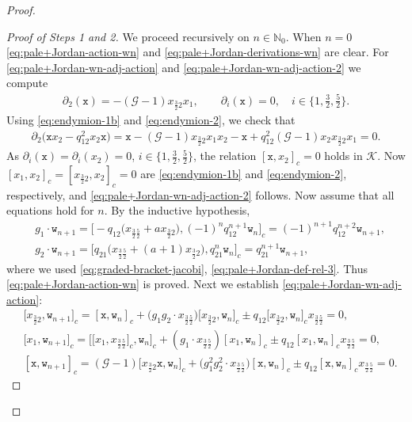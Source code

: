 \documentclass[10pt,a4paper]{amsart}
\numberwithin{equation}{section}
\newcommand{\ghost}{\mathscr{G}}
\newcommand{\K}{{\mathcal{K}}}
\newcommand{\N}{{\mathbb N}}
\newcommand{\wt}{\mathtt{w}}
\newcommand{\xt}{\mathtt{x}}
\newcommand{\tresdos}{\frac{3}{2}}
\newcommand{\cincodos}{\frac{5}{2}}
\begin{document}
\begin{proof}
\begin{proof}[Proof of Steps 1 and 2]
We proceed recursively on $n\in\N_0$.
When $n=0$ \eqref{eq:pale+Jordan-action-wn} and \eqref{eq:pale+Jordan-derivations-wn} are clear. For \eqref{eq:pale+Jordan-wn-adj-action} and \eqref{eq:pale+Jordan-wn-adj-action-2} we compute
\begin{align*}%
\partial_2(\xt) = -(\ghost-1)x_{\tresdos2}x_1, \qquad
\partial_i(\xt) = 0, \quad i\in\big\{1,\tfrac{3}{2},\tfrac{5}{2}\big\}.
\end{align*}
Using \eqref{eq:endymion-1b} and \eqref{eq:endymion-2}, we check that
\begin{align*}
\partial_2 \big(\xt x_2-q_{12}^2 x_2\xt\big) = \xt -(\ghost-1)x_{\tresdos2}x_1 x_2 -\xt +q_{12}^2(\ghost-1) x_2x_{\tresdos2}x_1=0.
\end{align*}
As $\partial_i(\xt) = \partial_i(x_2) = 0$, $i\in\{1,\tresdos,\cincodos\}$, the relation
$[\xt, x_2]_c=0$ holds in $\K$. Now $[x_1,x_2]_c=[x_{\tresdos2},x_2]_c=0$ are \eqref{eq:endymion-1b} and \eqref{eq:endymion-2}, respectively, and \eqref{eq:pale+Jordan-wn-adj-action-2} follows.
Now assume that all equations hold for $n$. By the inductive hypothesis,
\begin{align*}
&g_1\cdot \wt_{n+1} = \bigl[-q_{12}\big(x_{\tresdos\cincodos}+ax_{\tresdos2}\big), (-1)^n q_{12}^{n+1} \wt_n\big]_c =(-1)^{n+1} q_{12}^{n+2} \wt_{n+1},
\\
&g_2\cdot \wt_{n+1} = \big[q_{21}\big(x_{\tresdos\cincodos}+(a+1)x_{\tresdos2}\big), q_{21}^{n} \wt_n\big]_c = q_{21}^{n+1} \wt_{n+1},
\end{align*}
where we used \eqref{eq:graded-bracket-jacobi}, \eqref{eq:pale+Jordan-def-rel-3}. Thus \eqref{eq:pale+Jordan-action-wn} is proved.
Next we establish \eqref{eq:pale+Jordan-wn-adj-action}:
\begin{align*}
&\big[x_{\tresdos2},\wt_{n+1}\big]_c = [\xt,\wt_n]_c +\big(g_1g_2 \cdot x_{\tresdos\cincodos}\big)\big[x_{\tresdos2},\wt_n\big]_c \pm q_{12} \big[x_{\tresdos2},\wt_n\big]_c x_{\tresdos\cincodos}=0,
\\
&\big[x_1,\wt_{n+1}\big]_c = \big[\big[x_1,x_{\tresdos\cincodos}\big]_c,\wt_n\big]_c +(g_1 \cdot x_{\tresdos\cincodos})[x_1,\wt_n]_c \pm q_{12} [x_1,\wt_n]_c x_{\tresdos\cincodos}=0,
\\
&[\xt,\wt_{n+1}]_c = (\ghost-1)\big[x_{\tresdos2}\xt,\wt_n\big]_c +\big(g_1^2g_2^2 \cdot x_{\tresdos\cincodos}\big)[\xt,\wt_n]_c \pm q_{12} [\xt,\wt_n]_c x_{\tresdos\cincodos}=0.
\end{align*}

\end{proof}
\end{proof}
\end{document}
